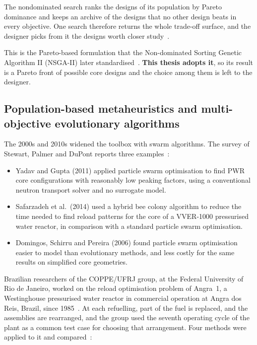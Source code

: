 The nondominated search ranks the designs of its population by Pareto
dominance and keeps an archive of the designs that no other design beats
in every objective. One search therefore returns the whole trade-off
surface, and the designer picks from it the designs worth closer
study~\cite{parks_1996}.

This is the Pareto-based formulation that the Non-dominated Sorting
Genetic Algorithm II (NSGA-II) later standardised~\cite{deb_nsga2_2002}.
\textbf{This thesis adopts it}, so its result is a Pareto front of possible core
designs and the choice among them is left to the designer.

\subsection{Population-based metaheuristics and multi-objective
evolutionary algorithms}
\label{sec:lit-opt-population}

The 2000s and 2010s widened the toolbox with swarm algorithms. The survey
of Stewart, Palmer and DuPont reports three examples~\cite{stewart_2021}:

\begin{itemize}
  \item Yadav and Gupta (2011) applied particle swarm optimisation to
        find PWR core configurations with reasonably low peaking factors,
        using a conventional neutron transport solver and no surrogate
        model.

  \item Safarzadeh et al.\ (2014) used a hybrid bee colony algorithm to
        reduce the time needed to find reload patterns for the core of a
        VVER-1000 pressurised water reactor, in comparison with a standard
        particle swarm optimisation.

  \item Domingos, Schirru and Pereira (2006) found particle swarm
        optimisation easier to model than evolutionary methods, and less
        costly for the same results on simplified core geometries.
\end{itemize}

Brazilian researchers of the COPPE/UFRJ group, at the Federal University
of Rio de Janeiro, worked on the reload optimisation problem of Angra~1,
a Westinghouse pressurised water reactor in commercial operation at Angra
dos Reis, Brazil, since 1985~\cite{eletronuclear_angra1}. At each
refuelling, part of the fuel is replaced, and the assemblies are
rearranged, and the group used the seventh operating cycle of the plant
as a common test case for choosing that arrangement. Four methods were
applied to it and compared~\cite{meneses_2010}:

